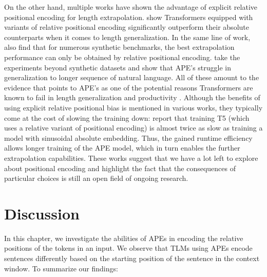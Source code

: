 \documentclass[letterpaper, 12pt]{report}
\begin{document}
On the other hand, multiple works have shown the advantage of explicit relative positional encoding for length extrapolation.
\citet{csordas2021:devil} show Transformers equipped with variants of relative positional encoding \citep{dai-2019:transformerxl, shaw-etal-2018-self} significantly outperform their absolute counterparts when it comes to length generalization.
In the same line of work, \citet{ontanon2022:compgen} also find that for numerous synthetic benchmarks, the best extrapolation performance can only be obtained by relative positional encoding.
\citet{press2022train} take the experiments beyond synthetic datasets and show that APE's struggle in generalization to longer sequence of natural language.
All of these amount to the evidence that points to APE's as one of the potential reasons Transformers are known to fail in length generalization and productivity \citep{pcfg,Lake2018:SCAN}.
Although the benefits of using explicit relative positional bias is mentioned in various works, they typically come at the cost of slowing the training down: \citep{press2022train} report that training T5 (which uses a relative variant of positional encoding) is almost twice as slow as training a model with sinusoidal absolute embedding. Thus, the gained runtime efficiency allows longer training of the APE model, which in turn enables the further extrapolation capabilities.
These works suggest that we have a lot left to explore about positional encoding and highlight the fact that the consequences of particular choices is still an open field of ongoing research.



\section{Discussion}
\label{sec:pos_discussion}

In this chapter, we investigate the abilities of APEs in encoding the relative positions of the tokens in an input. We observe that TLMs using APEs encode sentences differently based on the starting position of the sentence in the context window. To summarize our findings:
\end{document}

